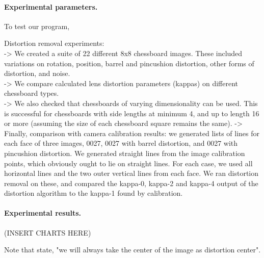\paragraph{Experimental parameters.}
To test our program, 

Distortion removal experiments:\\
-> We created a suite of 22 different 8x8 chessboard images. These included variations on rotation, position, barrel and pincushion distortion, other forms of distortion, and noise.\\
-> We compare calculated  lens distortion parameters (kappas) on different chessboard types.\\
-> We also checked that chessboards of varying dimensionality can be used. This is successful for chessboards with side lengths at minimum 4, and up to length 16 or more (assuming the size of each chessboard square remains the same).
-> Finally, comparison with camera calibration results: we generated lists of lines for each face of three images, 0027, 0027 with barrel distortion, and 0027 with pincushion distortion. We generated straight lines from the image calibration points, which obviously ought to lie on straight lines. For each case, we used all horizontal lines and the two outer vertical lines from each face. We ran distortion removal on these, and compared the kappa-0, kappa-2 and kappa-4 output of the distortion algorithm to the kappa-1 found by calibration.\\

\paragraph{Experimental results.}
(INSERT CHARTS HERE)

Note that \cite{algebraic-distortion} state, "we will always take the center of the image as distortion center".




